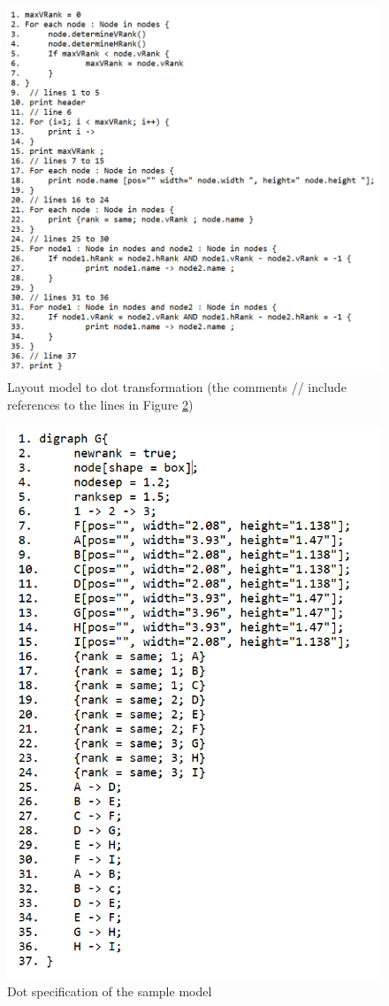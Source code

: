 \begin{figure}
	\centering
    \includegraphics[width=\linewidth]{pseudocode.PNG}
    \caption{Layout model to dot transformation (the comments // include references to the lines in Figure \ref{fig : dot code})}
    \label{fig : pseudocode}
\end{figure}
\begin{figure}
	\includegraphics[width=0.7\linewidth]{dotcode.PNG}
	\caption{Dot specification of the sample model}
	\label{fig : dot code}
\end{figure}

